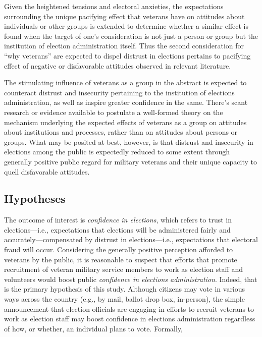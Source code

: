 \documentclass[
  12pt,
  letterpaper,
]{article}
\begin{document}
Given the heightened tensions and electoral anxieties, the expectations
surrounding the unique pacifying effect that veterans have on attitudes
about individuals or other groups is extended to determine whether a
similar effect is found when the target of one's consideration is not
just a person or group but the institution of election administration
itself. Thus the second consideration for ``why veterans'' are expected
to dispel distrust in elections pertains to pacifying effect of negative
or disfavorable attitudes observed in relevant literature.

The stimulating influence of veterans as a group in the abstract is
expected to counteract distrust and insecurity pertaining to the
institution of elections administration, as well as inspire greater
confidence in the same. There's scant research or evidence available to
postulate a well-formed theory on the mechanism underlying the expected
effects of veterans as a group on attitudes about institutions and
processes, rather than on attitudes about persons or groups. What may be
posited at best, however, is that distrust and insecurity in elections
among the public is expectedly reduced to some extent through generally
positive public regard for military veterans and their unique capacity
to quell disfavorable attitudes.

\subsection{Hypotheses}\label{hypotheses}

The outcome of interest is \emph{confidence in elections}, which refers
to trust in elections---i.e., expectations that elections will be
administered fairly and accurately---compensated by distrust in
elections---i.e., expectations that electoral fraud will occur.
Considering the generally positive perception afforded to veterans by
the public, it is reasonable to suspect that efforts that promote
recruitment of veteran military service members to work as election
staff and volunteers would boost public \emph{confidence in elections
administration}. Indeed, that is the primary hypothesis of this study.
Although citizens may vote in various ways across the country (e.g., by
mail, ballot drop box, in-person), the simple announcement that election
officials are engaging in efforts to recruit veterans to work as
election staff may boost confidence in elections administration
regardless of how, or whether, an individual plans to vote. Formally,
\end{document}
